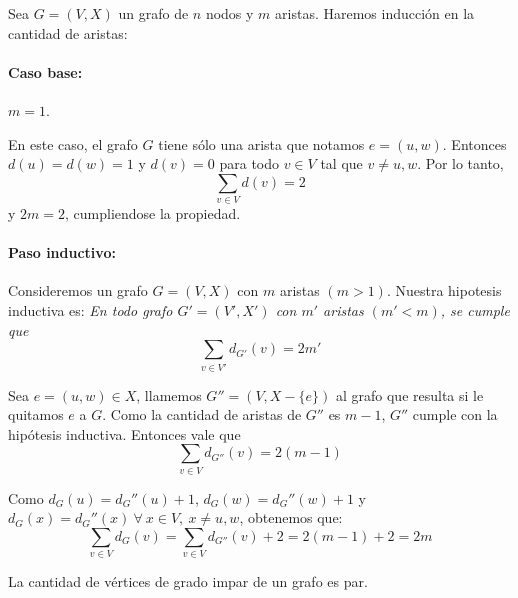 \begin{demo}
Sea \(G = (V, X)\) un grafo de \(n\) nodos y \(m\) aristas. Haremos inducción en la cantidad de aristas:

\paragraph{Caso base:} \(m = 1\).

	En este caso, el grafo \(G\) tiene sólo una arista que notamos \(e = (u,w)\). Entonces \(d(u) = d(w) = 1\) y \(d(v) = 0\) para todo \(v\in V\) tal que \(v\neq u,w\). Por lo tanto, \[\sum_{v\in V}d(v) = 2\] y \(2m = 2\), cumpliendose la propiedad.
\paragraph{Paso inductivo:} Consideremos un grafo \(G=(V,X)\) con \(m\) aristas \((m > 1)\). Nuestra hipotesis inductiva es: \textit{En todo grafo \(G' = (V', X')\) con \(m'\) aristas \((m' < m)\), se cumple que } \[\sum_{v\in V'}{d_{G'}}(v) = 2m'\]

Sea \(e = (u,w) \in X\), llamemos \(G'' = (V, X-\{e\})\) al grafo que resulta si le quitamos \(e\) a \(G\). Como la cantidad de aristas de \(G''\) es \(m-1\), \(G''\) cumple con la hipótesis inductiva. Entonces vale que 
 \[\sum_{v\in V}{d_{G''}}(v) = 2(m-1)\]
 
Como \(d_G(u) = d_G''(u) + 1\), \(d_G(w) = d_G''(w) + 1\) y \(d_G(x) = d_G''(x)~\forall~x\in V,~x\neq u,w\), obtenemos que: \[\sum_{v\in V}{d_{G}}(v) = \sum_{v\in V}{d_{G''}}(v) + 2 = 2(m-1) + 2 = 2m\]
\end{demo}

\begin{coro}
La cantidad de vértices de grado impar de un grafo es par.
\end{coro}


